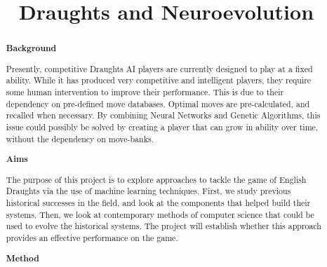 \documentclass[12pt,a4paper]{article}
\title{Draughts and Neuroevolution}
\author{}
\date{}
\begin{document}
\maketitle
\begin{abstract}


    {\bf Background}

    Presently, competitive Draughts AI players are currently designed to play at a fixed ability. While it has produced very competitive and intelligent players, they require some human intervention to improve their performance. 
    This is due to their dependency on pre-defined move databases. Optimal moves are pre-calculated, and recalled when necessary. By combining Neural Networks and Genetic Algorithms, this issue could possibly be solved by creating a player that can grow in ability over time, without the dependency on move-banks.
    
    {\bf Aims}

    The purpose of this project is to explore approaches to tackle the game of English Draughts via the use of machine learning techniques. First, we study previous historical successes in the field, and look at the components that helped build their systems. Then, we look at contemporary methods of computer science that could be used to evolve the historical systems. The project will establish whether this approach provides an effective performance on the game.
    
    {\bf Method}



\end{abstract}
\end{document}
